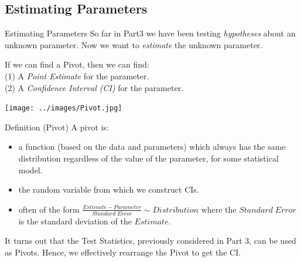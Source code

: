 \documentclass[t,xcolor=pdftex,dvipsnames,table]{beamer}\usepackage[]{graphicx}\usepackage[]{color}
\begin{document}
\subsection[Estimating]{Estimating Parameters}
\begin{frame}{Estimating Parameters}
So far in Part3 we have been testing {\it hypotheses} about an unknown parameter. 
Now we want to {\it estimate} the unknown parameter.

\vspace{.5cm}
If we can find a Pivot, then we can find:\\
(1) A {\it Point Estimate} for the parameter. \\
(2) A {\it Confidence Interval (CI)} for the parameter. 

\vspace{.5cm}
\texttt{[image: ../images/Pivot.jpg]}
\end{frame} 
 
 
\begin{frame}{}
\begin{block}{Definition (Pivot)}
A pivot is:
\begin{itemize}
\item a function (based on the data and parameters) which always has the same distribution regardless of the value of the parameter, for some statistical model.
\item the random variable from which we construct CIs.
\item often of the form $\frac{Estimate - Parameter}{Standard \; Error} \sim Distribution$
where the $Standard \; Error$ is the standard deviation of the $Estimate$.
\end{itemize}
\end{block}

\vspace{.5cm}
It turns out that the Test Statistics, previously considered in Part 3, can be used as Pivots. Hence, we effectively rearrange the Pivot to get the CI.
\end{frame} 
\end{document}
